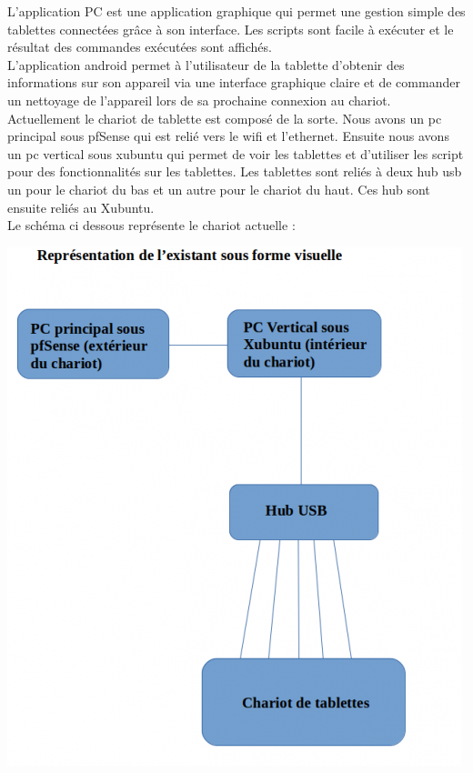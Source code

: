 \documentclass[a4paper,12pt]{extarticle}
\begin{document}
L’application PC est une application graphique qui permet une gestion simple des tablettes connectées grâce à son interface. Les scripts sont facile à exécuter et le résultat des commandes exécutées sont affichés. \\

L’application android permet à l’utilisateur de la tablette d’obtenir des informations sur son appareil via une interface graphique claire et de commander un nettoyage de l'appareil lors de sa prochaine connexion au chariot.\\

Actuellement le chariot de tablette est composé de la sorte. Nous avons un pc principal sous pfSense qui est relié vers le wifi et l’ethernet. Ensuite nous avons un pc vertical sous xubuntu qui permet de voir les tablettes et d’utiliser les script pour des fonctionnalités sur les tablettes. Les tablettes sont reliés à deux hub usb un pour le chariot du bas et un autre pour le chariot du haut. Ces hub sont ensuite reliés au Xubuntu.\\

Le schéma ci dessous représente le chariot actuelle :\\

\begin{center}
\includegraphics[scale=0.90]{representation_existant}
\end{center}
\end{document}
